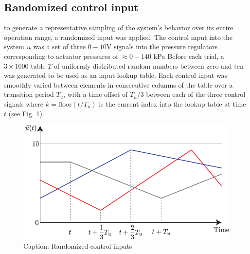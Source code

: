 \subsection{Randomized control input}

to generate a representative sampling of the system's behavior over its entire operation range, a randomized input was applied.
The control input into the system $u$ was a set of three $0-10 \text{V}$  signals into the pressure regulators corresponding to actuator pressures of $\approx 0-140 \text{ kPa}$
Before each trial, a $3 \times 1000$ table $\Upsilon$ of uniformly distributed random numbers between zero and ten was generated to be used as an input lookup table.
Each control input was smoothly varied between elements in consecutive columns of the table over a transition period $T_u$, with a time offset of $T_u / 3$ between each of the three control signals
where $k = \text{floor}\left( {t} / {T_u} \right)$ is the current index into the lookup table at time $t$ (see Fig. \ref{fig:randInput}).

\begin{figure}
    \centering
    \includegraphics[width=\linewidth]{figures/randInput3dim.pdf}
    \caption{Caption: Randomized control inputs }
    \label{fig:randInput}
\end{figure}

